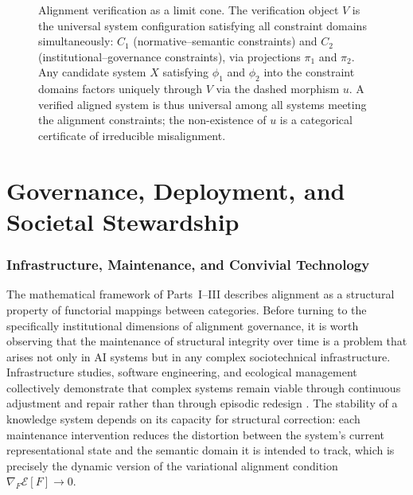\documentclass[12pt]{article}
\theoremstyle{definition}
\begin{document}
\begin{figure}[h]
\centering
{}
\caption{Alignment verification as a limit cone. The verification object $V$
is the universal system configuration satisfying all constraint domains
simultaneously: $C_1$ (normative--semantic constraints) and $C_2$
(institutional--governance constraints), via projections $\pi_1$ and $\pi_2$.
Any candidate system $X$ satisfying $\phi_1$ and $\phi_2$ into the constraint
domains factors uniquely through $V$ via the dashed morphism $u$. A verified
aligned system is thus universal among all systems meeting the alignment
constraints; the non-existence of $u$ is a categorical certificate of
irreducible misalignment.}
\label{fig:cone}
\end{figure}


\part{Governance, Deployment, and Societal Stewardship}

\section{Infrastructure, Maintenance, and Convivial Technology}

The mathematical framework of Parts~I--III describes alignment as a structural
property of functorial mappings between categories. Before turning to the
specifically institutional dimensions of alignment governance, it is worth
observing that the maintenance of structural integrity over time is a
problem that arises not only in AI systems but in any complex sociotechnical
infrastructure. Infrastructure studies, software engineering, and ecological
management collectively demonstrate that complex systems remain viable through
continuous adjustment and repair rather than through episodic redesign
\citep{star1999ethnography}. The stability of a knowledge system depends on its
capacity for structural correction: each maintenance intervention reduces the
distortion between the system's current representational state and the semantic
domain it is intended to track, which is precisely the dynamic version of the
variational alignment condition $\nabla_F \mathcal{E}[F] \to 0$.
\end{document}
